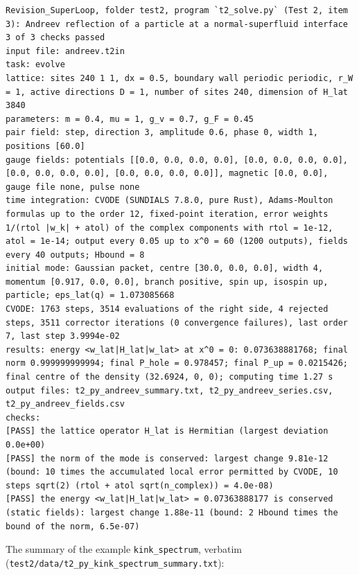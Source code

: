 \documentclass[
  10pt,
]{article}
\begin{document}
\begin{verbatim}
Revision_SuperLoop, folder test2, program `t2_solve.py` (Test 2, item 3): Andreev reflection of a particle at a normal-superfluid interface
3 of 3 checks passed
input file: andreev.t2in
task: evolve
lattice: sites 240 1 1, dx = 0.5, boundary wall periodic periodic, r_W = 1, active directions D = 1, number of sites 240, dimension of H_lat 3840
parameters: m = 0.4, mu = 1, g_v = 0.7, g_F = 0.45
pair field: step, direction 3, amplitude 0.6, phase 0, width 1, positions [60.0]
gauge fields: potentials [[0.0, 0.0, 0.0, 0.0], [0.0, 0.0, 0.0, 0.0], [0.0, 0.0, 0.0, 0.0], [0.0, 0.0, 0.0, 0.0]], magnetic [0.0, 0.0], gauge file none, pulse none
time integration: CVODE (SUNDIALS 7.8.0, pure Rust), Adams-Moulton formulas up to the order 12, fixed-point iteration, error weights 1/(rtol |w_k| + atol) of the complex components with rtol = 1e-12, atol = 1e-14; output every 0.05 up to x^0 = 60 (1200 outputs), fields every 40 outputs; Hbound = 8
initial mode: Gaussian packet, centre [30.0, 0.0, 0.0], width 4, momentum [0.917, 0.0, 0.0], branch positive, spin up, isospin up, particle; eps_lat(q) = 1.073085668
CVODE: 1763 steps, 3514 evaluations of the right side, 4 rejected steps, 3511 corrector iterations (0 convergence failures), last order 7, last step 3.9994e-02
results: energy <w_lat|H_lat|w_lat> at x^0 = 0: 0.073638881768; final norm 0.999999999994; final P_hole = 0.978457; final P_up = 0.0215426; final centre of the density (32.6924, 0, 0); computing time 1.27 s
output files: t2_py_andreev_summary.txt, t2_py_andreev_series.csv, t2_py_andreev_fields.csv
checks:
[PASS] the lattice operator H_lat is Hermitian (largest deviation 0.0e+00)
[PASS] the norm of the mode is conserved: largest change 9.81e-12 (bound: 10 times the accumulated local error permitted by CVODE, 10 steps sqrt(2) (rtol + atol sqrt(n_complex)) = 4.0e-08)
[PASS] the energy <w_lat|H_lat|w_lat> = 0.07363888177 is conserved (static fields): largest change 1.88e-11 (bound: 2 Hbound times the bound of the norm, 6.5e-07)
\end{verbatim}

The summary of the example \texttt{kink\_spectrum}, verbatim
(\texttt{test2/data/t2\_py\_kink\_spectrum\_summary.txt}):
\end{document}
